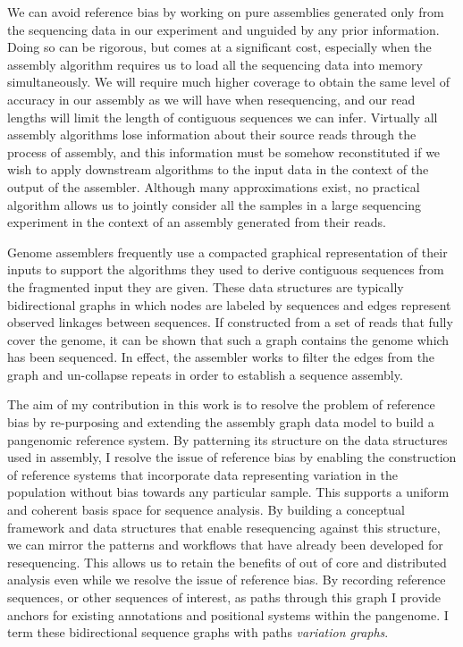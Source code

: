 We can avoid reference bias by working on pure assemblies generated only from the sequencing data in our experiment and unguided by any prior information.
Doing so can be rigorous, but comes at a significant cost, especially when the assembly algorithm requires us to load all the sequencing data into memory simultaneously.
We will require much higher coverage to obtain the same level of accuracy in our assembly as we will have when resequencing, and our read lengths will limit the length of contiguous sequences we can infer.
Virtually all assembly algorithms lose information about their source reads through the process of assembly, and this information must be somehow reconstituted if we wish to apply downstream algorithms to the input data in the context of the output of the assembler.
Although many approximations exist, no practical algorithm allows us to jointly consider all the samples in a large sequencing experiment in the context of an assembly generated from their reads.

Genome assemblers frequently use a compacted graphical representation of their inputs to support the algorithms they used to derive contiguous sequences from the fragmented input they are given.
These data structures are typically bidirectional graphs in which nodes are labeled by sequences and edges represent observed linkages between sequences.
If constructed from a set of reads that fully cover the genome, it can be shown that such a graph contains the genome which has been sequenced.
In effect, the assembler works to filter the edges from the graph and un-collapse repeats in order to establish a sequence assembly.

The aim of my contribution in this work is to resolve the problem of reference bias by re-purposing and extending the assembly graph data model to build a pangenomic reference system.
By patterning its structure on the data structures used in assembly, I resolve the issue of reference bias by enabling the construction of reference systems that incorporate data representing variation in the population without bias towards any particular sample.
This supports a uniform and coherent basis space for sequence analysis.
By building a conceptual framework and data structures that enable resequencing against this structure, we can mirror the patterns and workflows that have already been developed for resequencing.
This allows us to retain the benefits of out of core and distributed analysis even while we resolve the issue of reference bias.
By recording reference sequences, or other sequences of interest, as paths through this graph I provide anchors for existing annotations and positional systems within the pangenome.
I term these bidirectional sequence graphs with paths \emph{variation graphs}.


